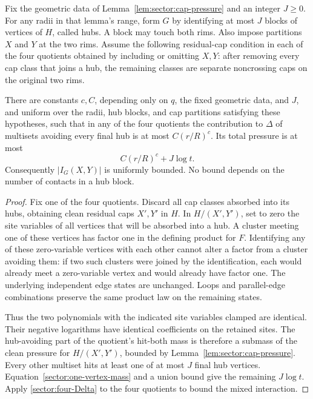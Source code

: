 \begin{lemma}
\label{lem:hub-mass}
Fix the geometric data of Lemma~\ref{lem:sector:cap-pressure} and an
integer $J\ge0$.  For any radii in that lemma's range, form $G$ by
identifying at most $J$ blocks of vertices of $H$, called hubs.
A block may touch both rims.  Also impose partitions $X$ and $Y$ at the
two rims.  Assume the following residual-cap condition in each of the
four quotients obtained by including or omitting $X,Y$: after removing
every cap class that joins a hub, the remaining classes are separate
noncrossing caps on the original two rims.

There are constants $c,C$, depending only on $q$, the fixed geometric
data, and $J$, and uniform over the radii, hub blocks, and cap
partitions satisfying these hypotheses, such that in any of the four
quotients the contribution to $\Delta$ of multisets avoiding every
final hub is at most $C(r/R)^c$.  Its total pressure is
at most
\begin{equation}
 C(r/R)^c+J\log t.
 \label{sector:hub-pressure-bound}
\end{equation}
Consequently $|I_G(X,Y)|$ is uniformly bounded.  No bound depends on
the number of contacts in a hub block.
\end{lemma}

\begin{proof}
Fix one of the four quotients.  Discard all cap classes absorbed into
its hubs, obtaining clean residual caps $X',Y'$ in $H$.  In
$H/(X',Y')$, set to zero the site variables of all vertices that will
be absorbed into a hub.  A cluster meeting one of these vertices has
factor one in the defining product for $F$.  Identifying any of these
zero-variable vertices with each other cannot alter a factor from a
cluster avoiding them: if two such clusters were joined by the
identification, each would already meet a zero-variable vertex and
would already have factor one.  The underlying independent edge
states are unchanged.  Loops and parallel-edge combinations preserve
the same product law on the remaining states.

Thus the two polynomials with the indicated site variables clamped
are identical.  Their negative logarithms have identical coefficients
on the retained sites.  The hub-avoiding part of the quotient's
hit-both mass is therefore a submass of the clean pressure for
$H/(X',Y')$, bounded by Lemma~\ref{lem:sector:cap-pressure}.
Every other multiset hits at least one of at most $J$ final hub
vertices.  Equation~\eqref{sector:one-vertex-mass} and a union bound
give the remaining $J\log t$.  Apply
\eqref{sector:four-Delta} to the four quotients to bound the mixed
interaction.
\end{proof}

